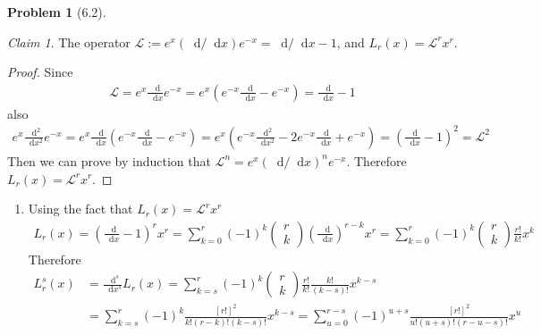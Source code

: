 \documentclass[twoside,11pt]{article}
\newcommand{\CL}{\mathcal{L}}
\renewcommand*\d{\mathop{}\!\mathrm{d}}
\theoremstyle{definition}
\newtheorem{problem}{Problem}
\theoremstyle{remark}
\newtheorem*{claim}{Claim}
\begin{document}
\begin{problem}[6.2]
    \begin{claim}
        The operator $\mathcal{L} := e^x (\d/\d x) e^{-x}= \d/\d x - 1$, 
        and $L_r(x) = \mathcal{L}^r x^r$.
    \end{claim}
    \begin{proof}
        Since
        \begin{align*}
            \CL = e^x\frac{\d }{\d x}e^{-x} = e^x\left(
                e^{-x}\frac{\d }{\d x}-e^{-x}\right) = 
            \frac{\d }{\d x} - 1
        \end{align*}
        also 
        \begin{align*}
            e^x\frac{\d^2}{\d x^2}e^{-x} = e^x\frac{\d}{\d x}\left(
                e^{-x}\frac{\d}{\d x} - e^{-x}
            \right)
            = e^x\left(
                e^{-x}\frac{\d^2}{\d x^2} - 2e^{-x}\frac{\d}{\d x} + e^{-x}
            \right)
            = \left(\frac{\d}{\d x} - 1\right)^2 = \CL^2
        \end{align*}
        Then we can prove by induction that $\CL^n = e^x(\d/\d x)^n e^{-x}$.
        Therefore $L_r(x) = \CL^r x^r$.
    \end{proof}
    \begin{enumerate}[label=(\alph*)]
        \item Using the fact that $L_r(x) = \CL^r x^r$
        \begin{align*}
            L_r(x) = \left(\frac{\d}{\d x} - 1\right)^r x^r = 
            \sum_{k=0}^r (-1)^k\begin{pmatrix}
                r\\k
            \end{pmatrix}\left(\frac{\d}{\d x}\right)^{r-k} x^r
            = \sum_{k=0}^r (-1)^k\begin{pmatrix}
                r\\k
            \end{pmatrix}\frac{r!}{k!}x^k
        \end{align*}
        Therefore
        \begin{align*}
            L^s_r(x)
            &= \frac{\d^s}{\d x^s} L_r(x)
            = \sum_{k=s}^r (-1)^k\begin{pmatrix}
                r\\k
            \end{pmatrix} \frac{r!}{k!}\frac{k!}{(k-s)!}x^{k-s}\\
            &= \sum_{k=s}^r (-1)^k \frac{[r!]^2}{k!(r-k)!(k-s)!}x^{k-s}
            = \sum_{u=0}^{r-s}(-1)^{u+s}\frac{[r!]^2}{u!(u+s)!(r-u-s)!}x^u
        \end{align*}



\end{enumerate}
\end{problem}
\end{document}
